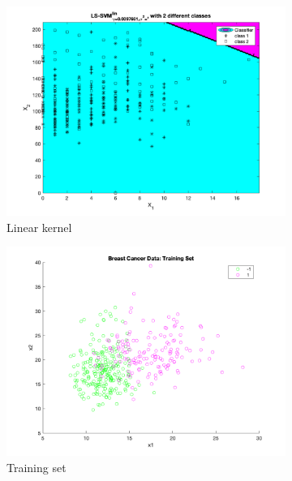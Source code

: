 \documentclass[a4paper, 11pt, one column]{article}
\begin{document}
\begin{figure}[hbt]
        \begin{subfigure}{0.45\linewidth}
            \includegraphics[width=\linewidth]{images/breast_linearkernel.png}
            \caption{Linear kernel}
        \end{subfigure}
        \begin{subfigure}{0.45\linewidth}
            \includegraphics[width=\linewidth]{images/breast_training.png}
            \caption{Training set}
        \end{subfigure}
        \begin{subfigure}{0.45\linewidth}

\end{subfigure}
\end{figure}
\end{document}
